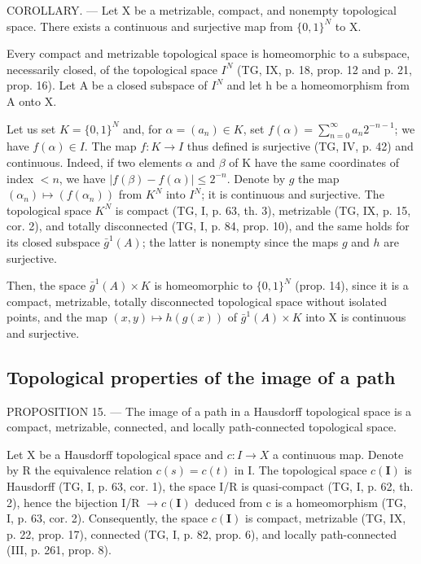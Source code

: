 COROLLARY. --- Let X be a metrizable, compact, and nonempty topological space. There exists a continuous and surjective map from \(\{0,1\}^{N}\) to X.

Every compact and metrizable topological space is homeomorphic to a subspace, necessarily closed, of the topological space \(I^{N}\) (TG, IX, p. 18, prop. 12 and p. 21, prop. 16). Let A be a closed subspace of \(I^{N}\) and let h be a homeomorphism from A onto X.

Let us set \(K = \{0,1\}^{N}\) and, for \(\alpha = (a_n) \in K\), set \(f(\alpha) = \sum_{n=0}^{\infty} a_n 2^{-n-1}\); we have \(f(\alpha) \in I\). The map \(f: K \to I\) thus defined is surjective (TG, IV, p. 42) and continuous. Indeed, if two elements \(\alpha\) and \(\beta\) of K have the same coordinates of index \(< n\), we have \(|f(\beta) - f(\alpha)| \leqslant 2^{-n}\). Denote by \(g\) the map \((\alpha_n) \mapsto (f(\alpha_n))\) from \(K^N\) into \(I^N\); it is continuous and surjective. The topological space \(K^N\) is compact (TG, I, p. 63, th. 3), metrizable (TG, IX, p. 15, cor. 2), and totally disconnected (TG, I, p. 84, prop. 10), and the same holds for its closed subspace \(\bar{g}^{1}(A)\); the latter is nonempty since the maps \(g\) and \(h\) are surjective.

Then, the space \(\bar{g}^{1}(A) \times K\) is homeomorphic to \(\{0,1\}^{N}\) (prop. 14), since it is a compact, metrizable, totally disconnected topological space without isolated points, and the map \((x,y) \mapsto h(g(x))\) of \(\bar{g}^{1}(A) \times K\) into X is continuous and surjective.

\subsection{Topological properties of the image of a path}

PROPOSITION 15. --- The image of a path in a Hausdorff topological space is a compact, metrizable, connected, and locally path-connected topological space.

Let X be a Hausdorff topological space and \(c\colon I \to X\) a continuous map. Denote by R the equivalence relation \(c(s) = c(t)\) in I. The topological space \(c(\mathbf{I})\) is Hausdorff (TG, I, p. 63, cor. 1), the space I/R is quasi-compact (TG, I, p. 62, th. 2), hence the bijection I/R \(\to c(\mathbf{I})\) deduced from c is a homeomorphism (TG, I, p. 63, cor. 2). Consequently, the space \(c(\mathbf{I})\) is compact, metrizable (TG, IX, p. 22, prop. 17), connected (TG, I, p. 82, prop. 6), and locally path-connected (III, p. 261, prop. 8).

